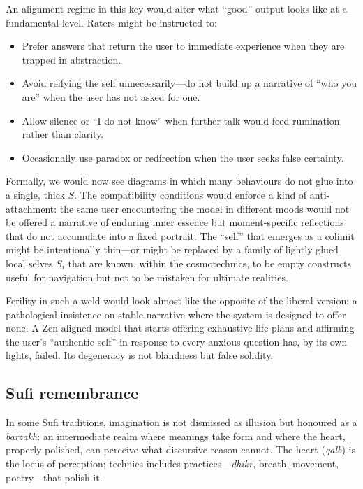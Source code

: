 \documentclass[12pt,a4paper]{article}
\begin{document}
An alignment regime in this key would alter what ``good'' output looks like at a fundamental level. Raters might be instructed to:

\begin{itemize}
  \item Prefer answers that return the user to immediate experience when they are trapped in abstraction.
  \item Avoid reifying the self unnecessarily---do not build up a narrative of ``who you are'' when the user has not asked for one.
  \item Allow silence or ``I do not know'' when further talk would feed rumination rather than clarity.
  \item Occasionally use paradox or redirection when the user seeks false certainty.
\end{itemize}

Formally, we would now see diagrams in which many behaviours do not glue into a single, thick $S$. The compatibility conditions would enforce a kind of anti-attachment: the same user encountering the model in different moods would not be offered a narrative of enduring inner essence but moment-specific reflections that do not accumulate into a fixed portrait. The ``self'' that emerges as a colimit might be intentionally thin---or might be replaced by a family of lightly glued local selves $S_i$ that are known, within the cosmotechnics, to be empty constructs useful for navigation but not to be mistaken for ultimate realities.

Ferility in such a weld would look almost like the opposite of the liberal version: a pathological insistence on stable narrative where the system is designed to offer none. A Zen-aligned model that starts offering exhaustive life-plans and affirming the user's ``authentic self'' in response to every anxious question has, by its own lights, failed. Its degeneracy is not blandness but false solidity.

\subsection{Sufi remembrance}

In some Sufi traditions, imagination is not dismissed as illusion but honoured as a \emph{barzakh}: an intermediate realm where meanings take form and where the heart, properly polished, can perceive what discursive reason cannot. The heart (\emph{qalb}) is the locus of perception; technics includes practices---\emph{dhikr}, breath, movement, poetry---that polish it.
\end{document}
